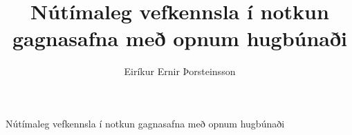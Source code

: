 \documentclass[final]{beamer}
\title{Nútímaleg vefkennsla í notkun gagnasafna með opnum hugbúnaði} %
\author{Eiríkur Ernir Þorsteinsson} %
\institute{Iðnaðarverkfræði-, vélaverkfræði- og tölvunarfræðideild} %
\begin{document}
\begin{frame}{} 
\vspace{0.2cm}
\begin{center}
\huge Nútímaleg vefkennsla í notkun gagnasafna með opnum hugbúnaði

\end{center}

\end{frame}
\end{document}

